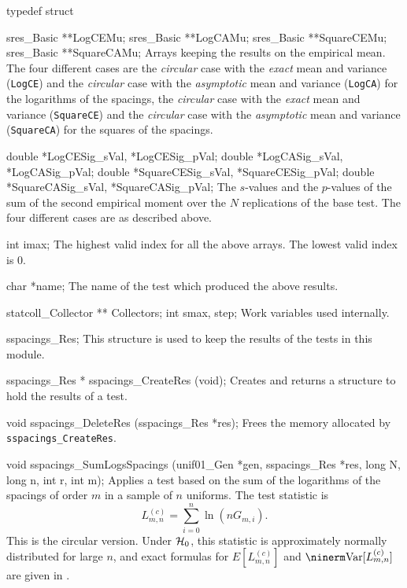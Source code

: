 typedef struct {

   sres_Basic **LogCEMu;
   sres_Basic **LogCAMu;
   sres_Basic **SquareCEMu;
   sres_Basic **SquareCAMu;
\endcode
 \tabb Arrays keeping the results on the empirical mean.
   The four different cases are the {\em circular} case with the {\em exact}
   mean and variance ({\tt LogCE}) and the {\em circular} case with the
   {\em asymptotic} mean and variance  ({\tt LogCA}) for the logarithms of the
   spacings, the {\em circular} case with the {\em exact} mean and variance
    ({\tt SquareCE})  and the {\em circular} case with the {\em asymptotic}
    mean and variance  ({\tt SquareCA}) for the squares of the spacings.
 \endtabb
\code

   double *LogCESig_sVal, *LogCESig_pVal;
   double *LogCASig_sVal, *LogCASig_pVal;
   double *SquareCESig_sVal, *SquareCESig_pVal;
   double *SquareCASig_sVal, *SquareCASig_pVal;
\endcode
 \tabb  The $s$-values and the $p$-values of the sum of the
   second empirical moment over the $N$ replications of the base test.
   The four different cases are as  described above.
 \endtabb
\code

   int imax;
\endcode
\tabb
   The  highest valid index for all the above arrays.
   The lowest valid index is 0.
\endtabb
\code

   char *name;
\endcode
 \tabb
  The name of the test which produced the above results.
 \endtabb
\fi  %
\hide %
\code

   statcoll_Collector ** Collectors;
   int smax, step;
\endcode
 \tabb
  Work variables used internally.
 \endtabb
\endhide %
\ifdetailed   %
\code

} sspacings_Res;
\endcode
 \tab
  This structure is used to keep the results of the tests in this module.
 \endtab
\code


sspacings_Res * sspacings_CreateRes (void);
\endcode
 \tab
  Creates and returns a structure to hold the results of a test.
 \endtab
\code


void sspacings_DeleteRes (sspacings_Res *res);
\endcode
 \tab
  Frees the memory allocated by {\tt sspacings\_CreateRes}.
 \endtab
\fi  %



\code

void sspacings_SumLogsSpacings (unif01_Gen *gen, sspacings_Res *res,
                                long N, long n, int r, int m);
\endcode
\tab
  Applies a test  based on the sum of the
  logarithms of the 
  spacings of order $m$ in a sample of $n$ uniforms.
  The test statistic is
 $$
  L_{m,n}^{(c)} = \sum_{i=0}^n \ln (n G_{m,i}).
 $$
  This is the circular version.
  Under $\mathcal{H}_0$, this statistic is approximately normally distributed
  for large $n$, and exact formulas for $E[L_{m,n}^{(c)}]$ and
  $\Var[L_{m,n}^{(c)}]$ are given in \cite{tCRE76a,rLEC97h}.
\endtab
\code


